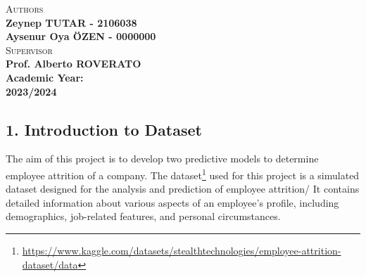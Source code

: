 \documentclass[
  12pt,
  paper=a4,
  ,captions=tableheading
]{scrartcl}
\begin{document}
\begin{titlepage}
\begin{center}
{  %
  \small
  \textsc{Authors} \\
  \large{\textbf{Zeynep TUTAR - 2106038 \\
      Aysenur Oya ÖZEN - 0000000}} \\
   \null
  \small
  \textsc{Supervisor} \\
  \large{\textbf{Prof. Alberto ROVERATO}} \\
  
   \null
  \large{\textbf{Academic Year: \\2023/2024}}
}


\end{center}
\end{titlepage}
\restoregeometry
{}




{
\hypersetup{linkcolor=}
\setcounter{tocdepth}{3}
\tableofcontents
\newpage
}
\subsection{1. Introduction to Dataset}\label{introduction-to-dataset}

The aim of this project is to develop two predictive models to determine
employee attrition of a company. The dataset\footnote{\url{https://www.kaggle.com/datasets/stealthtechnologies/employee-attrition-dataset/data}}
used for this project is a simulated dataset designed for the analysis
and prediction of employee attrition/ It contains detailed information
about various aspects of an employee's profile, including demographics,
job-related features, and personal circumstances.
\end{document}
